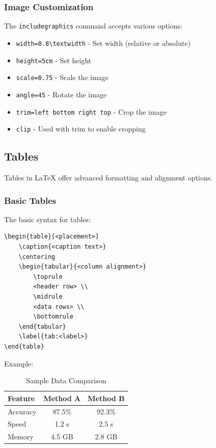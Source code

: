 \subsubsection{Image Customization}\label{subsubsec:image-customization}
The \texttt{includegraphics} command accepts various options:
\begin{itemize}
    \item \texttt{width=0.8\textbackslash textwidth} - Set width (relative or absolute)
    \item \texttt{height=5cm} - Set height
    \item \texttt{scale=0.75} - Scale the image
    \item \texttt{angle=45} - Rotate the image
    \item \texttt{trim=left bottom right top} - Crop the image
    \item \texttt{clip} - Used with trim to enable cropping
\end{itemize}

\subsection{Tables}\label{subsec:tables}
Tables in LaTeX offer advanced formatting and alignment options.

\subsubsection{Basic Tables}\label{subsubsec:basic-tables}
The basic syntax for tables:

\begin{verbatim}
\begin{table}[<placement>]
    \caption{<caption text>}
    \centering
    \begin{tabular}{<column alignment>}
        \toprule
        <header row> \\
        \midrule
        <data rows> \\
        \bottomrule
    \end{tabular}
    \label{tab:<label>}
\end{table}
\end{verbatim}

Example:
\begin{table}[htbp]
    \caption{Sample Data Comparison}
    \centering
    \begin{tabular}{lcc}
        \toprule
        \textbf{Feature} & \textbf{Method A} & \textbf{Method B} \\
        \midrule
        Accuracy & 87.5\% & 92.3\% \\
        Speed & 1.2 s & 2.5 s \\
        Memory & 4.5 GB & 2.8 GB \\
        \bottomrule
    \end{tabular}
    \label{tab:sample-comparison}
\end{table}

